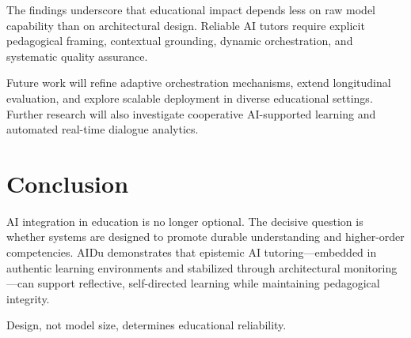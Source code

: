 \documentclass[10pt,twocolumn]{article}
\begin{document}
The findings underscore that educational impact depends less on raw
model capability than on architectural design. Reliable AI tutors
require explicit pedagogical framing, contextual grounding, dynamic
orchestration, and systematic quality assurance.

Future work will refine adaptive orchestration mechanisms, extend
longitudinal evaluation, and explore scalable deployment in diverse
educational settings. Further research will also investigate cooperative
AI-supported learning and automated real-time dialogue analytics.

\section{Conclusion}\label{conclusion}

AI integration in education is no longer optional. The decisive question
is whether systems are designed to promote durable understanding and
higher-order competencies. AIDu demonstrates that epistemic AI
tutoring---embedded in authentic learning environments and stabilized
through architectural monitoring---can support reflective, self-directed
learning while maintaining pedagogical integrity.

Design, not model size, determines educational reliability.




% 



\end{document}
